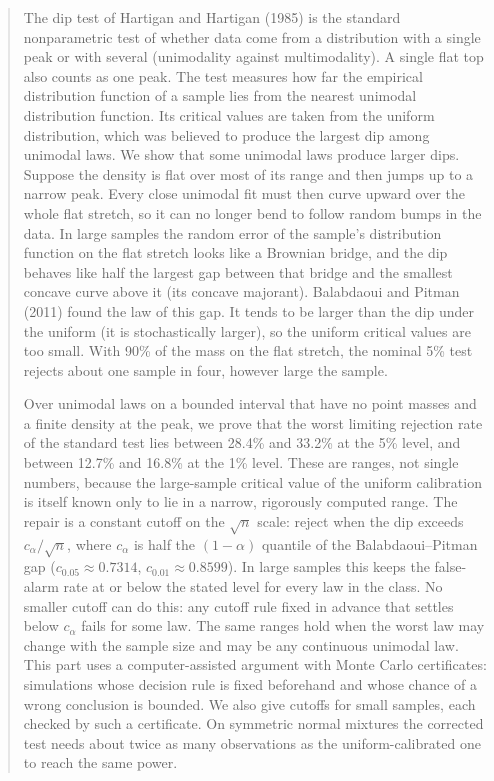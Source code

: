 \begin{abstract}
The dip test of Hartigan and Hartigan (1985) is the standard nonparametric test of whether data come from a distribution with a single peak or with several (unimodality against multimodality). A single flat top also counts as one peak. The test measures how far the empirical distribution function of a sample lies from the nearest unimodal distribution function. Its critical values are taken from the uniform distribution, which was believed to produce the largest dip among unimodal laws. We show that some unimodal laws produce larger dips. Suppose the density is flat over most of its range and then jumps up to a narrow peak. Every close unimodal fit must then curve upward over the whole flat stretch, so it can no longer bend to follow random bumps in the data. In large samples the random error of the sample's distribution function on the flat stretch looks like a Brownian bridge, and the dip behaves like half the largest gap between that bridge and the smallest concave curve above it (its concave majorant). Balabdaoui and Pitman (2011) found the law of this gap. It tends to be larger than the dip under the uniform (it is stochastically larger), so the uniform critical values are too small. With 90\% of the mass on the flat stretch, the nominal 5\% test rejects about one sample in four, however large the sample.

Over unimodal laws on a bounded interval that have no point masses and a finite density at the peak, we prove that the worst limiting rejection rate of the standard test lies between 28.4\% and 33.2\% at the 5\% level, and between 12.7\% and 16.8\% at the 1\% level. These are ranges, not single numbers, because the large-sample critical value of the uniform calibration is itself known only to lie in a narrow, rigorously computed range. The repair is a constant cutoff on the $\sqrt n$ scale: reject when the dip exceeds $c_\alpha/\sqrt n$, where $c_\alpha$ is half the $(1-\alpha)$ quantile of the Balabdaoui--Pitman gap ($c_{0.05}\approx0.7314$, $c_{0.01}\approx0.8599$). In large samples this keeps the false-alarm rate at or below the stated level for every law in the class. No smaller cutoff can do this: any cutoff rule fixed in advance that settles below $c_\alpha$ fails for some law. The same ranges hold when the worst law may change with the sample size and may be any continuous unimodal law. This part uses a computer-assisted argument with Monte Carlo certificates: simulations whose decision rule is fixed beforehand and whose chance of a wrong conclusion is bounded. We also give cutoffs for small samples, each checked by such a certificate. On symmetric normal mixtures the corrected test needs about twice as many observations as the uniform-calibrated one to reach the same power.
\end{abstract}
